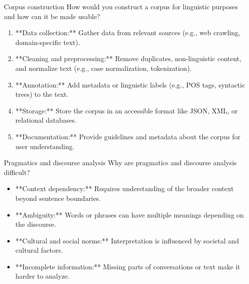 \documentclass{article}
\begin{document}
\setcounter{section}{2021}

\begin{exercise}{Corpus construction}
  How would you construct a corpus for linguistic purposes and how can it be made usable?

  \begin{solution}
    \begin{enumerate}
        \item **Data collection:** Gather data from relevant sources (e.g., web crawling, domain-specific text).
        \item **Cleaning and preprocessing:** Remove duplicates, non-linguistic content, and normalize text (e.g., case normalization, tokenization).
        \item **Annotation:** Add metadata or linguistic labels (e.g., POS tags, syntactic trees) to the text.
        \item **Storage:** Store the corpus in an accessible format like JSON, XML, or relational databases.
        \item **Documentation:** Provide guidelines and metadata about the corpus for user understanding.
    \end{enumerate}
  \end{solution}
\end{exercise}

\begin{exercise}{Pragmatics and discourse analysis}
  Why are pragmatics and discourse analysis difficult?

  \begin{solution}
    \begin{itemize}
        \item **Context dependency:** Requires understanding of the broader context beyond sentence boundaries.
        \item **Ambiguity:** Words or phrases can have multiple meanings depending on the discourse.
        \item **Cultural and social norms:** Interpretation is influenced by societal and cultural factors.
        \item **Incomplete information:** Missing parts of conversations or text make it harder to analyze.
    \end{itemize}
  \end{solution}
\end{exercise}
\end{document}
